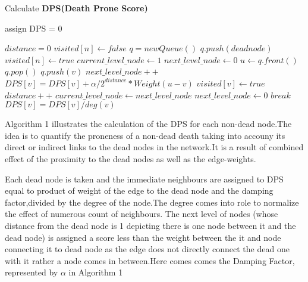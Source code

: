 \documentclass[conference]{IEEEtran}
\begin{document}
\begin{algorithm}
    \caption{Calculate \textbf{DPS(Death Prone Score)}}
    \begin{algorithmic}
         assign DPS = 0 \ENDFOR
        
       \STATE $distance = 0$
       \STATE $visited[n] \leftarrow {false}$
       \STATE $q = new Queue()$
       \STATE $q.push(deadnode)$
       \STATE $visited[n] \leftarrow {true}$
       \STATE $current\_level\_node \leftarrow 1$
       \STATE $next\_level\_node \leftarrow 0$
        \STATE $u \leftarrow q.front()$ 
        \STATE $q.pop()$
                \STATE $q.push(v)$
                \STATE $next\_level\_node++$
                \STATE $DPS[v]=DPS[v]+\alpha/2^{distance}*Weight(u-v)$
                \STATE $visited[v] \leftarrow {true}$  
            \ENDIF
        \ENDFOR
            \STATE $distance++$
            \STATE $current\_level\_node \leftarrow next\_level\_node$
            \STATE $next\_level\_node \leftarrow 0$
                \STATE $break$
            \ENDIF
        \ENDIF
        \ENDWHILE
         $DPS[v]=DPS[v]/deg(v)$
        \ENDFOR
    \end{algorithmic}
\end{algorithm}

Algorithm 1 illustrates the calculation of the DPS for each non-dead node.The idea is to quantify the proneness of a non-dead death taking into accouny its direct or indirect links to the dead nodes in the network.It is a result of combined effect of the proximity to the dead nodes as well as the edge-weights.

Each dead node is taken and the immediate neighbours are assigned to DPS equal to product of weight of the edge to the dead node and the damping factor,divided by the degree of the node.The degree comes into role to normalize the effect of numerous count of neighbours. The next level of nodes (whose distance from the dead node is 1 depicting there is one node between it and the dead node) is assigned a score less than the weight between the it and node connecting it to dead node as the edge does not directly connect the dead one with it rather a node comes in between.Here comes comes the Damping Factor, represented by $\alpha$ in Algorithm 1
\end{document}
